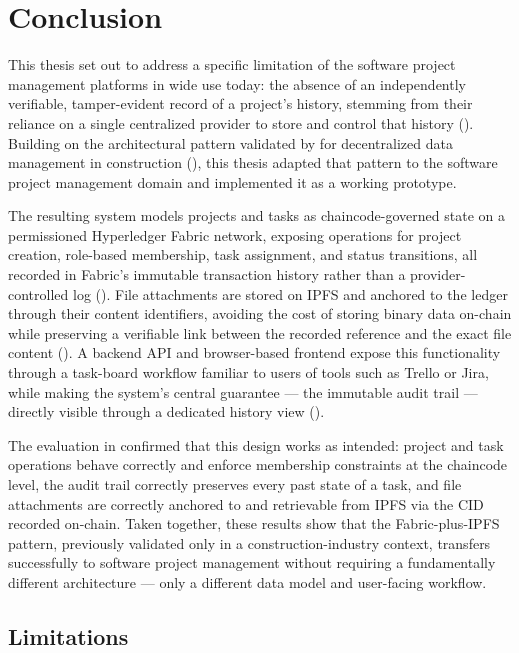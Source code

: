 \chapter{Conclusion}
\label{ch:conclusion}

This thesis set out to address a specific limitation of the software project management platforms in wide use today: the absence of an independently verifiable, tamper-evident record of a project's history, stemming from their reliance on a single centralized provider to store and control that history (). Building on the architectural pattern validated by \textcite{adel2023} for decentralized data management in construction (), this thesis adapted that pattern to the software project management domain and implemented it as a working prototype.

The resulting system models projects and tasks as chaincode-governed state on a permissioned Hyperledger Fabric network, exposing operations for project creation, role-based membership, task assignment, and status transitions, all recorded in Fabric's immutable transaction history rather than a provider-controlled log (). File attachments are stored on IPFS and anchored to the ledger through their content identifiers, avoiding the cost of storing binary data on-chain while preserving a verifiable link between the recorded reference and the exact file content (). A backend API and browser-based frontend expose this functionality through a task-board workflow familiar to users of tools such as Trello or Jira, while making the system's central guarantee — the immutable audit trail — directly visible through a dedicated history view ().

The evaluation in  confirmed that this design works as intended: project and task operations behave correctly and enforce membership constraints at the chaincode level, the audit trail correctly preserves every past state of a task, and file attachments are correctly anchored to and retrievable from IPFS via the CID recorded on-chain. Taken together, these results show that the Fabric-plus-IPFS pattern, previously validated only in a construction-industry context, transfers successfully to software project management without requiring a fundamentally different architecture — only a different data model and user-facing workflow.

\section{Limitations}
\label{sec:limitations}

